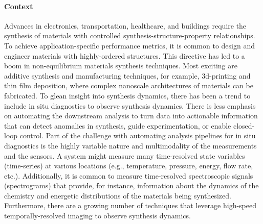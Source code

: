 \paragraph*{\textbf{Context}} Advances in electronics, transportation, healthcare, and buildings require the synthesis of materials with controlled synthesis-structure-property relationships. To achieve application-specific performance metrics, it is common to design and engineer materials with highly-ordered structures. This directive has led to a boom in non-equilibrium materials synthesis techniques. Most exciting are additive synthesis and manufacturing techniques, for example, 3d-printing\cite{Wang2020-tv,Parekh2016-vj,Visser2015-hy,Ligon2017-dg,Zarek2016-dw} and thin film deposition\cite{Chrisey1994-gw,Richter1990-ml,Yoshino2000-oo,Kelly2000-xk,Marvel2013-cd,George2010-pb,Park2001-so}, where complex nanoscale architectures of materials can be fabricated. To glean insight into synthesis dynamics, there has been a trend to include in situ diagnostics to observe synthesis dynamics\cite{Ojeda-G-P2017-la,Egelhoff1989-pr,Thomas1999-ij,Langereis2007-dj}. There is less emphasis  on automating the downstream analysis to turn data into actionable information that can detect anomalies in synthesis, guide experimentation, or enable closed-loop control. Part of the challenge with automating analysis pipelines for in situ diagnostics is the highly variable nature and multimodality of the measurements and the sensors. A system might measure many time-resolved state variables (time-series) at various locations (e.g., temperature, pressure, energy, flow rate, etc.)\cite{Hansen1999-an}. Additionally, it is common to measure time-resolved spectroscopic signals (spectrograms) that provide, for instance, information about the dynamics of the chemistry and energetic distributions of the materials being synthesized\cite{Cooks2018-jm,Termopoli2019-gb,Dauchot1995-cu,Aubriet2002-ln}. Furthermore, there are a growing number of techniques that leverage high-speed temporally-resolved imaging to observe synthesis dynamics\cite{Trigub2017-xw,Ojeda-G-P2018-cv}.

        
